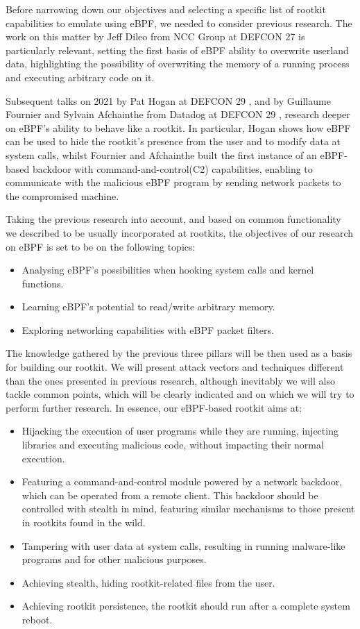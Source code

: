 Before narrowing down our objectives and selecting a specific list of rootkit capabilities to emulate using eBPF, we needed to consider previous research. The work on this matter by Jeff Dileo from NCC Group at DEFCON 27 \cite{evil_ebpf} is particularly relevant, setting the first basis of eBPF ability to overwrite userland data, highlighting the possibility of overwriting the memory of a running process and executing arbitrary code on it.

Subsequent talks on 2021 by Pat Hogan at DEFCON 29 \cite{bad_ebpf}, and by Guillaume Fournier and Sylvain Afchainthe from Datadog at DEFCON 29 \cite{ebpf_friends}, research deeper on eBPF's ability to behave like a rootkit. In particular, Hogan shows how eBPF can be used to hide the rootkit's presence from the user and to modify data at system calls, whilst Fournier and Afchainthe built the first instance of an eBPF-based backdoor with command-and-control(C2) capabilities, enabling to communicate with the malicious eBPF program by sending network packets to the compromised machine.

Taking the previous research into account, and based on common functionality we described to be usually incorporated at rootkits, the objectives of our research on eBPF is set to be on the following topics:
\begin{itemize}
\item Analysing eBPF's possibilities when hooking system calls and kernel functions.
\item Learning eBPF's potential to read/write arbitrary memory.
\item Exploring networking capabilities with eBPF packet filters.
\end{itemize}

The knowledge gathered by the previous three pillars will be then used as a basis for building our rootkit. We will present attack vectors and techniques different than the ones presented in previous research, although inevitably we will also tackle common points, which will be clearly indicated and on which we will try to perform further research. In essence, our eBPF-based rootkit aims at:
\begin{itemize}
\item Hijacking the execution of user programs while they are running, injecting libraries and executing malicious code, without impacting their normal execution.
\item Featuring a command-and-control module powered by a network backdoor, which can be operated from a remote client. This backdoor should be controlled with stealth in mind, featuring similar mechanisms to those present in rootkits found in the wild.
\item Tampering with user data at system calls, resulting in running malware-like programs and for other malicious purposes.
\item Achieving stealth, hiding rootkit-related files from the user.
\item Achieving rootkit persistence, the rootkit should run after a complete system reboot.
\
\end{itemize}

